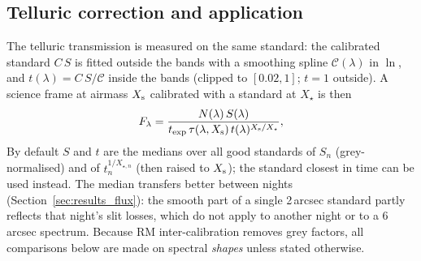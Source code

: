 \subsection{Telluric correction and application}
\label{sec:flux_tell}
The telluric transmission is measured on the same standard: the calibrated standard $C\,S$ is fitted outside the
bands with a smoothing spline $\mathcal{C}(\lambda)$ in $\ln$, and $t(\lambda)=C\,S/\mathcal{C}$ inside the bands
(clipped to $[0.02,1]$; $t=1$ outside). A science frame at airmass $X_{\rm s}$ calibrated with a standard at $X_\star$
is then
\begin{equation}
F_\lambda=\frac{N(\lambda)\,S(\lambda)}{t_{\rm exp}\,\tau(\lambda,X_{\rm s})\,t(\lambda)^{X_{\rm s}/X_\star}},
\label{eq:apply}
\end{equation}
By default $S$ and $t$ are the medians over all good standards of $S_n$ (grey-normalised) and of $t_n^{1/X_{\star,n}}$
(then raised to $X_{\rm s}$); the standard closest in time can be used instead. The median transfers better between
nights (Section~\ref{sec:results_flux}): the smooth part of a single 2\,arcsec standard partly reflects that night's
slit losses, which do not apply to another night or to a 6\,arcsec spectrum. Because RM inter-calibration removes
grey factors, all comparisons below are made on spectral \emph{shapes} unless stated otherwise.
